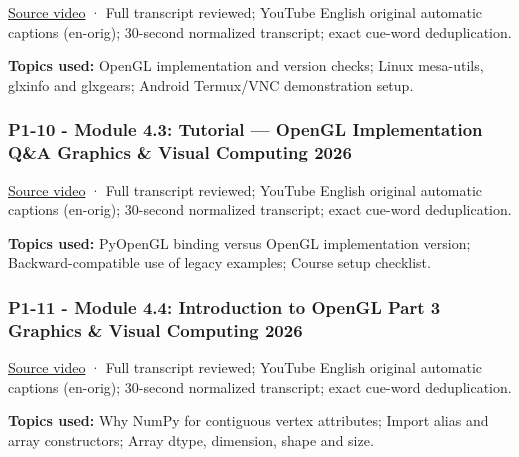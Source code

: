 \hypertarget{04-visual-computing-ii-ch036-p1-09---module-4.2-introduction-to-opengl-part-2-graphics-visual-computing-2026}{}

\href{https://www.youtube.com/watch?v=CpN9JORFZ7s}{Source video} · Full transcript reviewed; YouTube English original automatic captions (en-orig); 30-second normalized transcript; exact cue-word deduplication.

\textbf{Topics used:} OpenGL implementation and version checks; Linux mesa-utils, glxinfo and glxgears; Android Termux/VNC demonstration setup.

\subsubsection{P1-10 - Module 4.3: Tutorial --- OpenGL Implementation Q\&A Graphics \& Visual Computing 2026}\label{04-visual-computing-ii-ch036-p1-10---module-4.3-tutorial-opengl-implementation-qa-graphics-visual-computing-2026}

\hypertarget{04-visual-computing-ii-ch036-p1-10---module-4.3-tutorial-opengl-implementation-qa-graphics-visual-computing-2026}{}

\href{https://www.youtube.com/watch?v=Mt8QU6JWY20}{Source video} · Full transcript reviewed; YouTube English original automatic captions (en-orig); 30-second normalized transcript; exact cue-word deduplication.

\textbf{Topics used:} PyOpenGL binding versus OpenGL implementation version; Backward-compatible use of legacy examples; Course setup checklist.

\subsubsection{P1-11 - Module 4.4: Introduction to OpenGL Part 3 Graphics \& Visual Computing 2026}\label{04-visual-computing-ii-ch036-p1-11---module-4.4-introduction-to-opengl-part-3-graphics-visual-computing-2026}

\hypertarget{04-visual-computing-ii-ch036-p1-11---module-4.4-introduction-to-opengl-part-3-graphics-visual-computing-2026}{}

\href{https://www.youtube.com/watch?v=sr-4ZAnBXIM}{Source video} · Full transcript reviewed; YouTube English original automatic captions (en-orig); 30-second normalized transcript; exact cue-word deduplication.

\textbf{Topics used:} Why NumPy for contiguous vertex attributes; Import alias and array constructors; Array dtype, dimension, shape and size.

